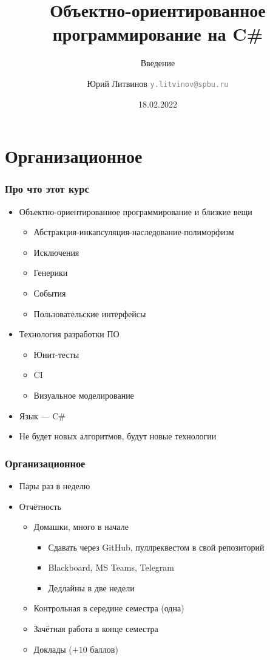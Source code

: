 \documentclass[xetex,mathserif,serif]{beamer}
\title{Объектно-ориентированное программирование на C\#}
\subtitle{Введение}
\author[Юрий Литвинов]{Юрий Литвинов \newline \textcolor{gray}{\small\texttt{y.litvinov@spbu.ru}}}
\date{18.02.2022}
\begin{document}
    
    \frame{\titlepage}

    \section{Организационное}

    \begin{frame}
        \frametitle{Про что этот курс}
        \begin{itemize}
            \item Объектно-ориентированное программирование и близкие вещи
            \begin{itemize}
                \item Абстракция-инкапсуляция-наследование-полиморфизм
                \item Исключения
                \item Генерики
                \item События
                \item Пользовательские интерфейсы
            \end{itemize}
            \item Технология разработки ПО
            \begin{itemize}
                \item Юнит-тесты
                \item CI
                \item Визуальное моделирование
            \end{itemize}
            \item Язык --- C\#
            \item Не будет новых алгоритмов, будут новые технологии
        \end{itemize}
    \end{frame}

    \begin{frame}
        \frametitle{Организационное}
        \begin{itemize}
            \item Пары раз в неделю
            \item Отчётность
            \begin{itemize}
                \item Домашки, много в начале
                \begin{itemize}
                    \item Сдавать через GitHub, пуллреквестом в свой репозиторий
                    \item Blackboard, MS Teams, Telegram
                    \item Дедлайны в две недели
                \end{itemize}
                \item Контрольная в середине семестра (одна)
                \item Зачётная работа в конце семестра
                \item Доклады ($+10$ баллов)
            \end{itemize}
        \end{itemize}
    \end{frame}
\end{document}
